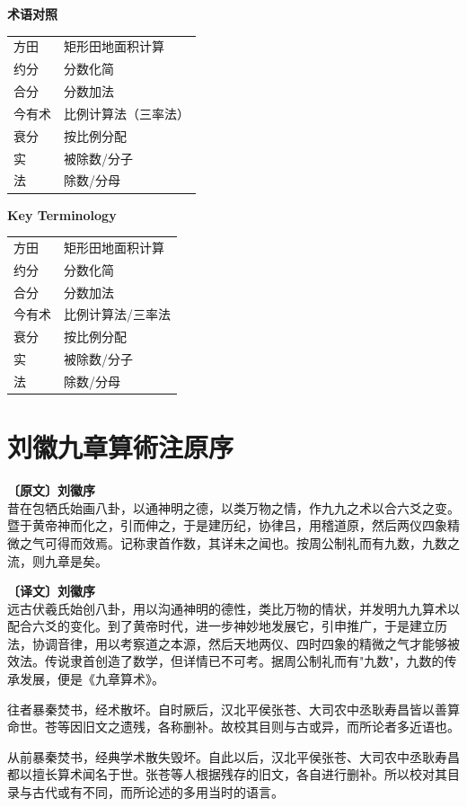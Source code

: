 \documentclass[10pt,a4paper]{article}
\newlength{\lw}
\newlength{\rw}
\newcommand{\biling}[2]{%
  \par\vspace{0.2em}%
  \noindent%
  \colorbox{classicalbg}{\parbox{\dimexpr\lw-2\fboxsep\relax}{#1}}%
  \hfill%
  \colorbox{modernbg}{\parbox{\dimexpr\rw-2\fboxsep\relax}{#2}}%
  \vspace{0.2em}%
}
\newcommand{\sk}{\vspace{0.1em}}
\begin{document}
\sk

\biling{
\textbf{术语对照}\\[0.2em]
\begin{tabular}{@{}l@{：}l@{}}
方田 & 矩形田地面积计算\\
约分 & 分数化简\\
合分 & 分数加法\\
今有术 & 比例计算法（三率法）\\
衰分 & 按比例分配\\
实 & 被除数/分子\\
法 & 除数/分母\\
\end{tabular}
}{
\textbf{Key Terminology}\\[0.2em]
\begin{tabular}{@{}l@{ $\to$ }l@{}}
方田 & 矩形田地面积计算\\
约分 & 分数化简\\
合分 & 分数加法\\
今有术 & 比例计算法/三率法\\
衰分 & 按比例分配\\
实 & 被除数/分子\\
法 & 除数/分母\\
\end{tabular}
}

\newpage

\section*{刘徽九章算術注原序}

\biling{
\textbf{〔原文〕刘徽序}\\[0.2em]
昔在包牺氏始画八卦，以通神明之德，以类万物之情，作九九之术以合六爻之变。暨于黄帝神而化之，引而伸之，于是建历纪，协律吕，用稽道原，然后两仪四象精微之气可得而效焉。记称隶首作数，其详未之闻也。按周公制礼而有九数，九数之流，则九章是矣。
}{
\textbf{〔译文〕刘徽序}\\[0.2em]
远古伏羲氏始创八卦，用以沟通神明的德性，类比万物的情状，并发明九九算术以配合六爻的变化。到了黄帝时代，进一步神妙地发展它，引申推广，于是建立历法，协调音律，用以考察道之本源，然后天地两仪、四时四象的精微之气才能够被效法。传说隶首创造了数学，但详情已不可考。据周公制礼而有"九数"，九数的传承发展，便是《九章算术》。
}

\sk

\biling{
往者暴秦焚书，经术散坏。自时厥后，汉北平侯张苍、大司农中丞耿寿昌皆以善算命世。苍等因旧文之遗残，各称删补。故校其目则与古或异，而所论者多近语也。
}{
从前暴秦焚书，经典学术散失毁坏。自此以后，汉北平侯张苍、大司农中丞耿寿昌都以擅长算术闻名于世。张苍等人根据残存的旧文，各自进行删补。所以校对其目录与古代或有不同，而所论述的多用当时的语言。
}
\end{document}
